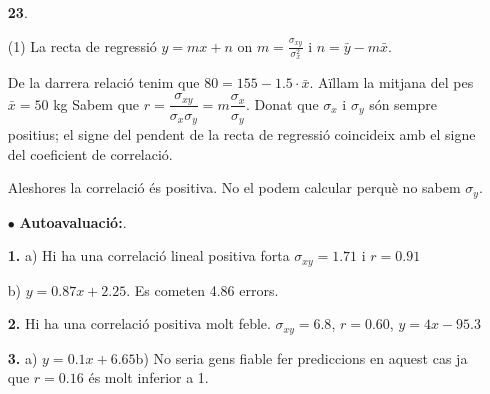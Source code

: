 \documentclass[a4paper, pdf, twoside]{book}
\begin{document}
\begin{multicols}{2}
\begin{enumerate}

 \item[\fontfamily{phv}\selectfont\color{blue}\textbf{23}. ] 
 \begin{tasks}[column-sep=1em, item-indent=1.3333em](1)
	 \task* La recta de regressió $y=mx+n$ on $m=\frac {\sigma _{xy}}{\sigma _x^2}$ i $n=\bar y - m \bar x$. \par De la darrera relació tenim que $80=155 - 1.5 \cdot \bar x$. Aïllam la mitjana del pes $\bar x=50$ kg
	 \task* Sabem que $r=\dfrac {\sigma _{xy}}{\sigma _x \sigma _y}=m\dfrac {\sigma _x}{\sigma _y}$. Donat que $\sigma _{x}$ i $\sigma _y$ són sempre positius; el signe del pendent de la recta de regressió coincideix amb el signe del coeficient de correlació. \par Aleshores
	 \task* la correlació és positiva. No el podem calcular perquè no sabem $\sigma _y$. 
\end{tasks}
 \end{enumerate}
\begin{enumerate}
\vspace{0.25cm}
 \item[$\bullet$ ] {\selectfont\color{blue}\textbf{Autoavaluació:}. }

\vspace{0.25cm}
\item[\fontfamily{phv}\selectfont\color{blue}\textbf{1. }]  \scalebox{0.6}{\simbolclau } 
a) Hi ha una correlació lineal positiva forta $\sigma _{xy}=1.71$ i $r=0.91$\par b) $y=0.87x+2.25$. Es cometen 4.86 errors.
\vspace{0.25cm}
\item[\fontfamily{phv}\selectfont\color{blue}\textbf{2. }]  \scalebox{0.6}{\simbolclau } 
Hi ha una correlació positiva molt feble. $\sigma _{xy}=6.8$, $r=0.60$, $y=4x-95.3$
\vspace{0.25cm}
\item[\fontfamily{phv}\selectfont\color{blue}\textbf{3. }]  \scalebox{0.6}{\simbolclau } 
a) $y=0.1x+6.65$\quad b) No seria gens fiable fer prediccions en aquest cas ja que $r=0.16$ és molt inferior a 1.
 \end{enumerate}
\end{multicols}
\end{document}
